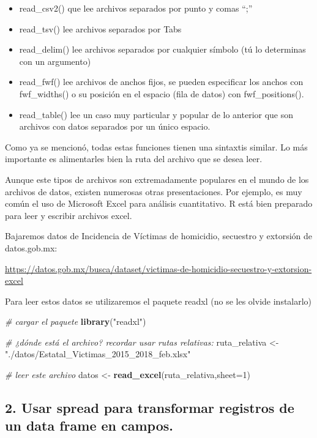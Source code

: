 \documentclass[]{book}
\newenvironment{Shaded}{\begin{snugshade}}{\end{snugshade}}
\newcommand{\KeywordTok}[1]{\textcolor[rgb]{0.13,0.29,0.53}{\textbf{#1}}}
\newcommand{\DataTypeTok}[1]{\textcolor[rgb]{0.13,0.29,0.53}{#1}}
\newcommand{\DecValTok}[1]{\textcolor[rgb]{0.00,0.00,0.81}{#1}}
\newcommand{\StringTok}[1]{\textcolor[rgb]{0.31,0.60,0.02}{#1}}
\newcommand{\CommentTok}[1]{\textcolor[rgb]{0.56,0.35,0.01}{\textit{#1}}}
\newcommand{\NormalTok}[1]{#1}
\providecommand{\tightlist}{%
  \setlength{\itemsep}{0pt}\setlength{\parskip}{0pt}}
\theoremstyle{definition}
\theoremstyle{definition}
\theoremstyle{definition}
\theoremstyle{remark}
\begin{document}
\begin{itemize}
\tightlist
\item
  read\_csv2() que lee archivos separados por punto y comas ``;''
\item
  read\_tsv() lee archivos separados por Tabs
\item
  read\_delim() lee archivos separados por cualquier símbolo (tú lo
  determinas con un argumento)
\item
  read\_fwf() lee archivos de anchos fijos, se pueden especificar los
  anchos con fwf\_widths() o su posición en el espacio (fila de datos)
  con fwf\_positions().
\item
  read\_table() lee un caso muy particular y popular de lo anterior que
  son archivos con datos separados por un único espacio.
\end{itemize}

Como ya se mencionó, todas estas funciones tienen una sintaxtis similar.
Lo más importante es alimentarles bien la ruta del archivo que se desea
leer.

Aunque este tipos de archivos son extremadamente populares en el mundo
de los archivos de datos, existen numerosas otras presentaciones. Por
ejemplo, es muy común el uso de Microsoft Excel para análisis
cuantitativo. R está bien preparado para leer y escribir archivos excel.

Bajaremos datos de Incidencia de Víctimas de homicidio, secuestro y
extorsión de datos.gob.mx:

\url{https://datos.gob.mx/busca/dataset/victimas-de-homicidio-secuestro-y-extorsion-excel}

Para leer estos datos se utilizaremos el paquete readxl (no se les
olvide instalarlo)

\begin{Shaded}
\begin{Highlighting}[]
\CommentTok{# cargar el paquete}
\KeywordTok{library}\NormalTok{(}\StringTok{"readxl"}\NormalTok{)}

\CommentTok{# ¿dónde está el archivo? recordar usar rutas relativas:}
\NormalTok{ruta_relativa <-}\StringTok{ "./datos/Estatal_Victimas_2015_2018_feb.xlsx"}

\CommentTok{# leer este archivo }
\NormalTok{datos <-}\StringTok{ }\KeywordTok{read_excel}\NormalTok{(ruta_relativa,}\DataTypeTok{sheet=}\DecValTok{1}\NormalTok{)}
\end{Highlighting}
\end{Shaded}

\subsection{2. Usar spread para transformar registros de un data frame
en
campos.}\label{usar-spread-para-transformar-registros-de-un-data-frame-en-campos.}
\end{document}
